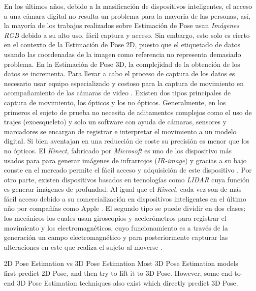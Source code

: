 En los últimos años, debido a la masificación
de dispositivos inteligentes, el acceso a una cámara digital no resulta un problema para la mayoria
de las personas, así, la mayoría de los trabajos realizados sobre Estimación de Pose usan
\textit{Imágenes RGB} debido a su alto uso, fácil captura y acceso.
Sin embargo, esto solo es cierto en el contexto de la Estimación de Pose 2D, puesto que el etiquetado de datos
usando las coordenadas de la imagen como referencia no representa demasiado problema. En la
Estimación de Pose 3D, la complejidad de la obtención de los datos se incrementa. Para llevar a cabo
el proceso de captura de los datos es necesario usar equipo especializado y costoso para la captura
de movimiento en acompañamiento de las cámaras de video \cite{6682899}. Existen dos tipos principales de captura
de movimiento, los ópticos y los no ópticos.
Generalmente, en los primeros el sujeto de prueba no necesita de aditamentos complejos como el uso de trajes
(exoesqueleto) y solo un software con ayuda de cámaras, sensores y marcadores se
encargan de registrar e interpretar el movimiento a un modelo digital. Si bien
aventajan en una reducción de coste su precisión es menor que los no ópticos.
El \textit{Kinect}, fabricado por \textit{Microsoft} es uno de los dispositivo más usados para
para generar imágenes de infrarrojos (\textit{IR-image}) y gracias a su bajo conste en el mercado
permite el fácil acceso y adquisición de este dispositivo
\cite{6165146} \cite{Izadi11kinectfusion:real-time}.
Por otro parte, existen dispositivos basados en tecnologías como \textit{LIDAR} cuya función es
generar imágenes de profundad. Al igual que el \textit{Kinect}, cada vez son de más fácil acceso
debido a su comercialización en dispositivos inteligentes en el último año por compañías como Apple
\cite{DBLP:journals/corr/abs-1711-06396}. El segundo tipo se puede dividir en dos clases;
los mecánicos los cuales usan giroscopios y acelerómetros para registrar el
movimiento y los electromagnéticos, cuyo funcionamiento es a través de la generación un campo
electromagnético y para posteriormente capturar las alteraciones en este que realiza el sujeto al moverse
\cite{articleMotion}.


2D Pose Estimation vs 3D Pose Estimation
Most 3D Pose Estimation models first predict 2D Pose, and then try to lift it to 3D Pose. However,
some end-to-end 3D Pose Estimation techniques also exist which directly predict 3D Pose.


